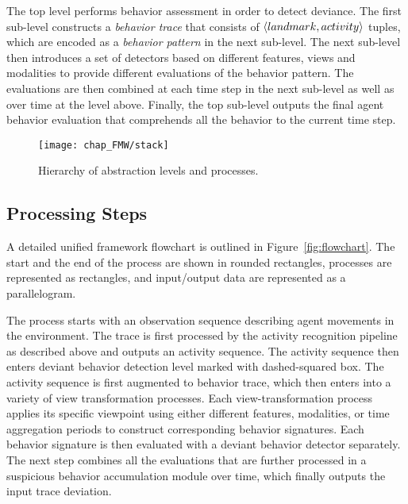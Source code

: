 The top level performs behavior assessment in order to detect deviance. The first sub-level constructs a \emph{behavior trace} that consists of $\langle landmark, activity \rangle$ tuples, which are encoded as a \emph{behavior pattern} in the next sub-level. The next sub-level then introduces a set of detectors based on different features, views and modalities to provide different evaluations of the behavior pattern. The evaluations are then combined at each time step in the next sub-level as well as over time at the level above. Finally, the top sub-level outputs the final agent behavior evaluation that comprehends all the behavior to the current time step. 



\begin{figure}[!h]
\centering
\texttt{[image: chap\_FMW/stack]}
\caption{Hierarchy of abstraction levels and processes.}
\label{fig:stack}
\end{figure}

\subsection{Processing Steps}

A detailed unified framework flowchart is outlined in Figure~\ref{fig:flowchart}. The start and the end of the process are shown in rounded rectangles, processes are represented as rectangles, and input/output data are represented as a parallelogram.

The process starts with an observation sequence describing agent movements in the environment. The trace is first processed by the activity recognition pipeline as described above and outputs an activity sequence. The activity sequence then enters deviant behavior detection level marked with dashed-squared box. The activity sequence is first augmented to behavior trace, which then enters into a variety of view transformation processes. Each view-transformation process applies its specific viewpoint using either different features, modalities, or time aggregation periods to construct corresponding behavior signatures. Each behavior signature is then evaluated with a deviant behavior detector separately. The next step combines all the evaluations that are further processed in a suspicious behavior accumulation module over time, which finally outputs the input trace deviation.

